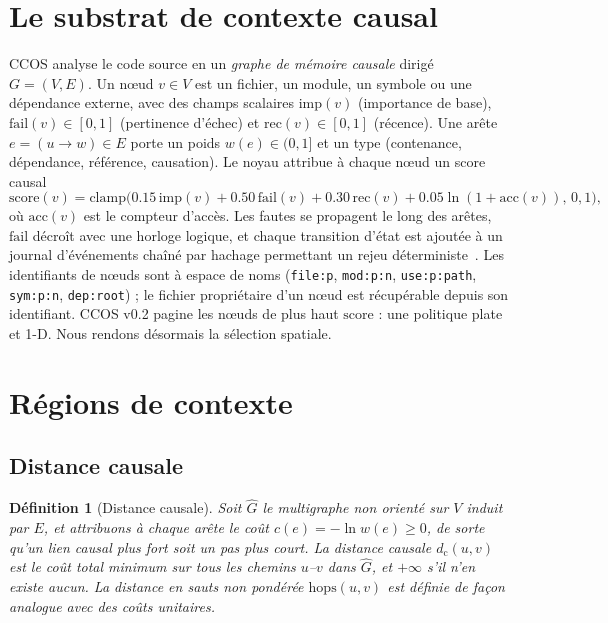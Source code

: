 \documentclass[11pt]{article}
\newtheorem{definition}{Définition}
\newcommand{\dcausal}{d_{\mathrm{c}}}
\newcommand{\code}[1]{\texttt{#1}}
\begin{document}
\section{Le substrat de contexte causal}\label{sec:substrate}

CCOS analyse le code source en un \emph{graphe de mémoire causale} dirigé $G=(V,E)$.
Un nœud $v\in V$ est un fichier, un module, un symbole ou une dépendance externe,
avec des champs scalaires $\mathrm{imp}(v)$ (importance de base),
$\mathrm{fail}(v)\in[0,1]$ (pertinence d'échec) et $\mathrm{rec}(v)\in[0,1]$
(récence). Une arête $e=(u\!\to\!w)\in E$ porte un poids $w(e)\in(0,1]$ et un type
(contenance, dépendance, référence, causation). Le noyau attribue à chaque nœud un
score causal
\begin{equation}
\mathrm{score}(v) = \mathrm{clamp}\big(0.15\,\mathrm{imp}(v) + 0.50\,\mathrm{fail}(v)
  + 0.30\,\mathrm{rec}(v) + 0.05\ln(1{+}\mathrm{acc}(v)),\,0,1\big),
\label{eq:score}
\end{equation}
où $\mathrm{acc}(v)$ est le compteur d'accès. Les fautes se propagent le long des
arêtes, $\mathrm{fail}$ décroît avec une horloge logique, et chaque transition d'état
est ajoutée à un journal d'événements chaîné par hachage permettant un rejeu
déterministe~\cite{haber1991timestamp}. Les identifiants de nœuds sont à espace de
noms (\code{file:p}, \code{mod:p:n}, \code{use:p:path}, \code{sym:p:n},
\code{dep:root}) ; le fichier propriétaire d'un nœud est récupérable depuis son
identifiant. CCOS v0.2 pagine les nœuds de plus haut $\mathrm{score}$ : une politique
plate et 1-D. Nous rendons désormais la sélection spatiale.

\section{Régions de contexte}\label{sec:regions}

\subsection{Distance causale}

\begin{definition}[Distance causale]
Soit $\hat G$ le multigraphe non orienté sur $V$ induit par $E$, et attribuons à
chaque arête le coût $c(e) = -\ln w(e) \ge 0$, de sorte qu'un lien causal plus fort
soit un pas plus court. La \emph{distance causale} $\dcausal(u,v)$ est le coût total
minimum sur tous les chemins $u$--$v$ dans $\hat G$, et $+\infty$ s'il n'en existe
aucun. La distance en sauts non pondérée $\mathrm{hops}(u,v)$ est définie de façon
analogue avec des coûts unitaires.
\end{definition}
\end{document}
